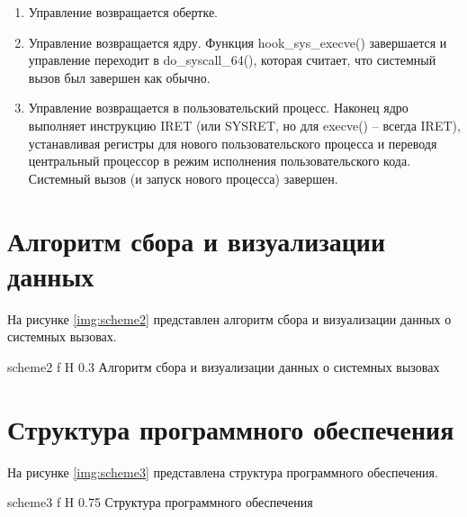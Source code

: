 \begin{enumerate}
	\item Управление возвращается обертке. 
	\item Управление возвращается ядру. Функция hook\_sys\_execve() завершается и управление переходит в do\_syscall\_64(), которая считает, что системный вызов был завершен как обычно. 
	\item Управление возвращается в пользовательский процесс. Наконец ядро выполняет инструкцию IRET (или SYSRET, но для execve() -- всегда IRET), устанавливая регистры для нового пользовательского процесса и переводя центральный процессор в режим исполнения пользовательского кода. Системный вызов (и запуск нового процесса) завершен.
\end{enumerate}

\section{Алгоритм сбора и визуализации данных}

На рисунке \ref{img:scheme2} представлен алгоритм сбора и визуализации данных о системных вызовах.

	{scheme2}
	{f}
	{H}
	{0.3\textwidth}
	{Алгоритм сбора и визуализации данных о системных вызовах}

\section{Структура программного обеспечения}

На рисунке \ref{img:scheme3} представлена структура программного обеспечения.

{scheme3}
{f}
{H}
{0.75\textwidth}
{Структура программного обеспечения}